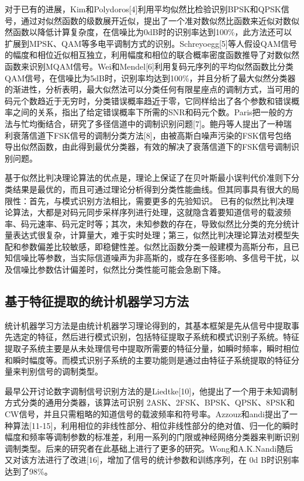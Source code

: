 对于已有的进展，Kim和Polydoros[4]利用平均似然比检验识别BPSK和QPSK信号，通过对似然函数的级数展开近似，提出了一个准对数似然比函数来近似对数似然函数以降低计算复杂度，在信噪比为0dB时的识别率达到100\%，此方法还可以扩展到MPSK、QAM等多电平调制方式的识别。Schreyoegg[5]等人假设QAM信号的幅度和相位近似相互独立，利用幅度和相位的联合概率密度函数推导了对数似然函数来识别MQAM信号。Wei和Mendel[6]利用复码元序列的平均似然函数比分类QAM信号，在信噪比为5dB时，识别率均达到100\%，并且分析了最大似然分类器的渐进性，分析表明，最大似然法可以分类任何有限星座点的调制方式，当可用的码元个数趋近于无穷时，分类错误概率趋近于零，它同样给出了各个参数和错误概率之间的关系，指出了给定错误概率下所需的SNR和码元个数。Paris把一般的方法与忙均衡结合，研究了多径信道中的调制识别问题[7]。鲍丹等人提出了一种瑞利衰落信道下FSK信号的调制分类方法[8]，由被高斯白噪声污染的FSK信号包络导出似然函数，由此得到最优分类器，有效的解决了衰落信道下的FSK信号调制识别问题。\par
 
基于似然比判决理论算法的优点是，理论上保证了在贝叶斯最小误判代价准则下分类结果是最优的，而且可通过理论分析得到分类性能曲线。但其同事具有很大的局限性：首先，与模式识别方法相比，需要更多的先验知识。 已有的似然比判决理论算法，大都是对码元同步采样序列进行处理，这就隐含着要知道信号的载波频率、码元速率、码元定时等；其次，未知参数的存在，导致似然比分类的充分统计量表达式很复杂，计算量大，难于实时处理；第三，似然比判决理论算法对模型失配和参数偏差比较敏感，即稳健性差。似然比函数分类一般建模为高斯分布，且已知信噪比等参数，当实际信道噪声为非高斯的，或存在多径影响、多信号干扰，以及信噪比参数估计偏差时，似然比分类性能可能会急剧下降。 \par
 
\subsection{基于特征提取的统计机器学习方法}

统计机器学习方法是由统计机器学习理论得到的，其基本框架是先从信号中提取事先选定的特征，然后进行模式识别，包括特征提取子系统和模式识别子系统。特征提取子系统主要是从未处理信号中提取所需要的特征分量，如瞬时频率，瞬时相位和瞬时幅度等。而模式识别子系统的主要功能则是通过由特征子系统提取的特征分量来判别信号的调制类型。 \par

最早公开讨论数字调制信号识别方法的是Liedtke[10]，他提出了一个用于未知调制方式分类的通用分类器，该算法可识别 2ASK、2FSK、BPSK、QPSK、8PSK和CW信号，并且只需粗略的知道信号的载波频率和符号率。Azzouz和andi提出了一种算法[11-15]，利用相位的非线性部分、相位非线性部分的绝对值、归一化的瞬时幅度和频率等调制参数的标准差，利用一系列的门限或神经网络分类器来判断识别调制类型。后来的研究者在此基础上进行了更多的研究。Wong和A.K.Nandi随后又对该方法进行了改进[16]，增加了信号的统计参数和训练序列，在 0d B时识别率达到了98\%。\par

